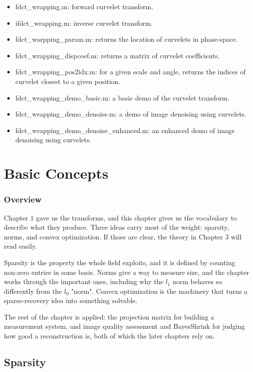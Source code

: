 \documentclass[10pt,a4paper,oneside,numbers=noenddot]{scrbook}
\theoremstyle{ctplain}
\theoremstyle{ctresult}
\begin{document}
\begin{itemize}
  \item fdct\_wrapping.m: forward curvelet transform.
  \item ifdct\_wrapping.m: inverse curvelet transform.
  \item fdct\_warpping\_param.m: returns the location of curvelets in phase-space.
  \item fdct\_wrapping\_dispcoef.m: returns a matrix of curvelet coefficients.
  \item fdct\_wrapping\_pos2idx.m: for a given scale and angle, returns the indices of
  curvelet closest to a given position.
  \item fdct\_wrapping\_demo\_basic.m: a basic demo of the curvelet transform.
  \item fdct\_wrapping\_demo\_denoise.m: a demo of image denoising using curvelets.
  \item fdct\_wrapping\_demo\_denoise\_enhanced.m: an enhanced demo of image denoising
  using curvelets.
\end{itemize}

\chapter{Basic Concepts}

\subsection*{Overview}

Chapter 1 gave us the transforms, and this chapter gives us the vocabulary to describe what
they produce. Three ideas carry most of the weight: sparsity, norms, and convex
optimization. If those are clear, the theory in Chapter 3 will read easily.

Sparsity is the property the whole field exploits, and it is defined by counting non-zero
entries in some basis. Norms give a way to measure size, and the chapter works through the
important ones, including why the $l_1$ norm behaves so differently from the $l_0$ "norm".
Convex optimization is the machinery that turns a sparse-recovery idea into something
solvable.

The rest of the chapter is applied: the projection matrix for building a measurement
system, and image quality assessment and BayesShrink for judging how good a reconstruction
is, both of which the later chapters rely on.


\section{Sparsity}
\end{document}
